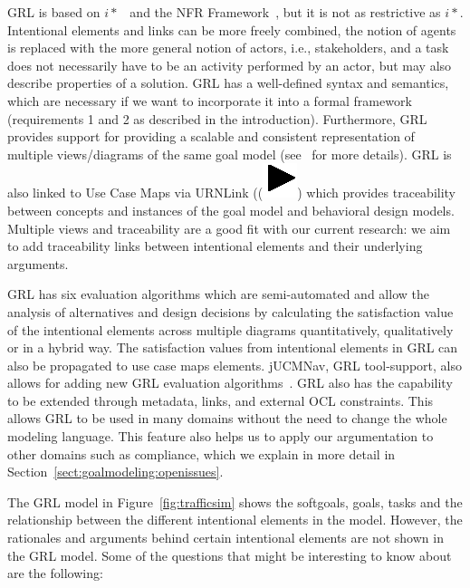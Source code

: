 GRL is based on $i*$~\cite{Yu:1997:TMR:827255.827807} and the NFR Framework~\cite{chung2012non}, but it is not as restrictive as $i*$. Intentional elements and links can be more freely combined, the notion of agents is replaced with the more general notion of actors, i.e., stakeholders, and a task does not necessarily have to be an activity performed by an actor, but may also describe properties of a solution. GRL has a well-defined syntax and semantics, which are necessary if we want to incorporate it into a formal framework (requirements 1 and 2 as described in the introduction). Furthermore, GRL provides support for providing a scalable and consistent representation of multiple views/diagrams of the same goal model (see~\cite[Ch.2]{Ghanavati2013} for more details). GRL is also linked to Use Case Maps via URNLink ((\includegraphics[scale=1]{img/urnlink}) which provides traceability between concepts and instances of the goal model and behavioral design models. Multiple views and traceability are a good fit with our current research: we aim to add traceability links between intentional elements and their underlying arguments. 

GRL has six evaluation algorithms which are semi-automated and allow the analysis of alternatives and design decisions by calculating the satisfaction value of the intentional elements across multiple diagrams quantitatively, qualitatively or in a hybrid way. The satisfaction values from intentional elements in GRL can also be propagated to use case maps elements.  jUCMNav, GRL tool-support, also allows for adding new GRL evaluation algorithms~\cite{jUCMNav}. GRL also has the capability to be extended through metadata, links, and external OCL constraints. This allows GRL to be used in many domains without the need to change the whole modeling language. This feature also helps us to apply our argumentation to other domains such as compliance, which we explain in more detail in Section~\ref{sect:goalmodeling:openissues}.

The GRL model in Figure~\ref{fig:trafficsim} shows the softgoals, goals, tasks and the relationship between the different intentional elements in the model. However, the rationales and arguments behind certain intentional elements are not shown in the GRL model. Some of the questions that might be interesting to know about are the following:

